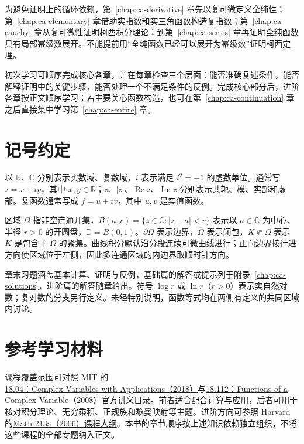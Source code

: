 为避免证明上的循环依赖，第~\ref{chap:ca-derivative} 章先以复可微定义全纯性；第~\ref{chap:ca-elementary} 章借助实指数和实三角函数构造复指数；第~\ref{chap:ca-cauchy} 章从复可微性证明柯西积分理论；到第~\ref{chap:ca-series} 章再证明全纯函数具有局部幂级数展开。不能提前用“全纯函数已经可以展开为幂级数”证明柯西定理。

初次学习可顺序完成核心各章，并在每章检查三个层面：能否准确复述条件，能否解释证明中的关键步骤，能否处理一个不满足条件的反例。完成核心部分后，进阶各章按正文顺序学习；若主要关心函数构造，也可在第~\ref{chap:ca-continuation} 章之后直接集中学习第~\ref{chap:ca-entire} 章。

\section{记号约定}

以 $\mathbb{R}$、$\mathbb{C}$ 分别表示实数域、复数域，$i$ 表示满足 $i^2=-1$ 的虚数单位。通常写 $z=x+iy$，其中 $x,y\in\mathbb{R}$；$\overline z$、$|z|$、$\operatorname{Re}z$、$\operatorname{Im}z$ 分别表示共轭、模、实部和虚部。复函数通常写成 $f=u+iv$，其中 $u,v$ 是实值函数。

区域 $\Omega$ 指非空连通开集，$B(a,r)=\{z\in\mathbb{C}:|z-a|<r\}$ 表示以 $a\in\mathbb{C}$ 为中心、半径 $r>0$ 的开圆盘，$\mathbb{D}=B(0,1)$。$\partial\Omega$ 表示边界，$\overline\Omega$ 表示闭包，$K\Subset\Omega$ 表示 $K$ 是包含于 $\Omega$ 的紧集。曲线积分默认沿分段连续可微曲线进行；正向边界按行进方向使区域位于左侧，因此多连通区域的内边界取顺时针方向。

章末习题涵盖基本计算、证明与反例，基础篇的解答或提示列于附录~\ref{chap:ca-solutions}，进阶篇的解答随章给出。符号 $\log r$ 或 $\ln r$（$r>0$）表示实自然对数；复对数的分支另行定义。未经特别说明，函数等式均在两侧有定义的共同区域内讨论。

\section{参考学习材料}

课程覆盖范围可对照 MIT 的\href{https://ocw.mit.edu/courses/18-04-complex-variables-with-applications-spring-2018/pages/lecture-notes/}{18.04：Complex Variables with Applications（2018）}与\href{https://ocw.mit.edu/courses/18-112-functions-of-a-complex-variable-fall-2008/pages/lecture-notes/}{18.112：Functions of a Complex Variable（2008）}官方讲义目录。前者适合配合计算与应用，后者可用于核对积分理论、无穷乘积、正规族和黎曼映射等主题。进阶方向可参照 Harvard 的\href{https://people.math.harvard.edu/~ctm/home/text/class/harvard/213a/06/html/syl.html}{Math 213a（2006）课程大纲}。本书的章节顺序按上述知识依赖独立组织，不将这些课程的全部专题纳入正文。


